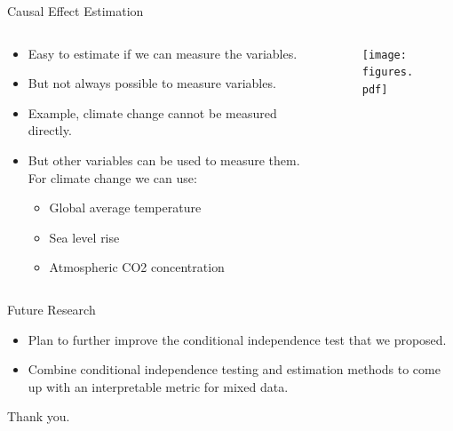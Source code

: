 \documentclass[aspectratio=169]{beamer}
\begin{document}
\begin{frame}{Causal Effect Estimation}
	\begin{columns}
		\begin{column}{0.65 \textwidth}
			\begin{itemize}
				\item Easy to estimate if we can measure the variables.
				\item But not always possible to measure variables.
				\item Example, climate change cannot be measured directly.
				\item But other variables can be used to measure them. For climate change we can use:
					\begin{itemize}
						\item Global average temperature
						\item Sea level rise
						\item Atmospheric CO2 concentration
					\end{itemize}
			\end{itemize}
		\end{column}
		\begin{column}{0.38 \textwidth}	
			\begin{figure}
				\center
				\texttt{[image: figures.pdf]}
			\end{figure}
		\end{column}
	\end{columns}

	\vspace{2em}
	
\end{frame}

\begin{frame}{Future Research}
	\begin{itemize}
		\item Plan to further improve the conditional independence test that we proposed.
		\item Combine conditional independence testing and estimation methods to come up with an interpretable metric for mixed data.
	\end{itemize}
\end{frame}

\begin{frame}
	\Huge{Thank you.}
\end{frame}
\end{document}
